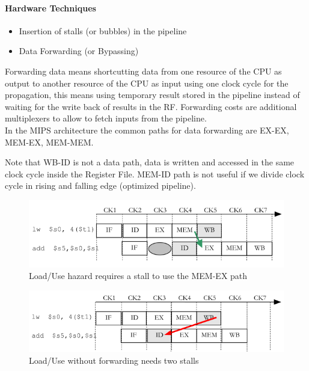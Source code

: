 \paragraph{Hardware Techniques}
\begin{itemize}
    \item[\textrightarrow] Insertion of stalls (or bubbles) in the pipeline
    \item[\textrightarrow] Data Forwarding (or Bypassing)
\end{itemize}

Forwarding data means shortcutting data from one resource of the CPU as output to another resource of the CPU as
input using one clock cycle for the propagation, this means using temporary result stored in the pipeline instead of
waiting for the write back of results in the RF\@.
Forwarding costs are additional multiplexers to allow to fetch inputs from the pipeline.\\
In the MIPS architecture the common paths for data forwarding are EX-EX, MEM-EX, MEM-MEM\@.

Note that WB-ID is not a data path, data is written and accessed in the same clock cycle inside the Register File.
MEM-ID path is not useful if we divide clock cycle in rising and falling edge (optimized pipeline).


\begin{figure}[h]
    \centering
    \includegraphics[scale=0.4]{images/load-use-hazard}
    \caption{Load/Use hazard requires a stall to use the MEM-EX path}
    \label{fig:load-use-hazard}
\end{figure}


\begin{figure}[h]
    \centering
    \includegraphics[scale=0.4]{images/load-use-without-forwarding}
    \caption{Load/Use without forwarding needs two stalls}
    \label{fig:load-use-without-forwarding}
\end{figure}


